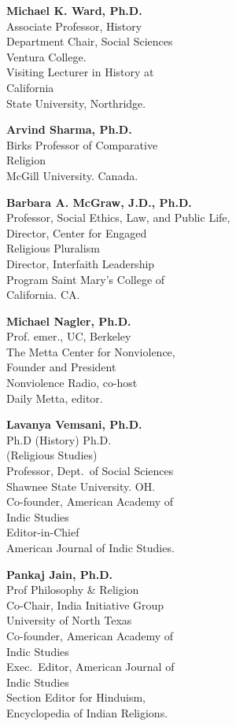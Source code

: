 \begin{multicols}{2}
\begin{trivlist}
\item \textbf{Michael K. Ward, Ph.D.} \\
Associate Professor, History\\
Department Chair, Social Sciences\\
Ventura College.\\[2pt]
Visiting Lecturer in History at\\ California\\
State University, Northridge. 

\item \textbf{Arvind Sharma, Ph.D.}\\ 
Birks Professor of Comparative\\ Religion\\ 
McGill University. Canada.
 
\item \textbf{Barbara A. McGraw, J.D., Ph.D.}\\ 
Professor, Social Ethics, Law, and Public Life,\\[2pt]
Director, Center for Engaged\\ Religious Pluralism\\[2pt]
Director, Interfaith Leadership\\ Program
Saint Mary’s College of\\ California. CA.
 

\item \textbf{Michael Nagler, Ph.D.}\\
Prof. emer., UC, Berkeley\\
The Metta Center for Nonviolence,\\ 
Founder and President\\
Nonviolence Radio, co-host\\ 
Daily Metta, editor.
 
\item \textbf{Lavanya Vemsani, Ph.D.}\\ 
Ph.D (History) Ph.D.\\ (Religious Studies)\\
Professor, Dept.\ of Social Sciences\\
Shawnee State University. OH.\\ 
Co-founder, American Academy of\\ Indic Studies\\ 
Editor-in-Chief\\ 
American Journal of Indic Studies.
 
\item \textbf{Pankaj Jain, Ph.D.}\\ 
Prof Philosophy \& Religion\\
Co-Chair, India Initiative Group\\
University of North Texas\\[2pt]
Co-founder, American Academy of\\ Indic Studies\\[2pt]
Exec.\ Editor, American Journal of\\ Indic Studies\\
Section Editor for Hinduism,\\[2pt] 
Encyclopedia of Indian Religions.
 

\end{trivlist}
\end{multicols}

